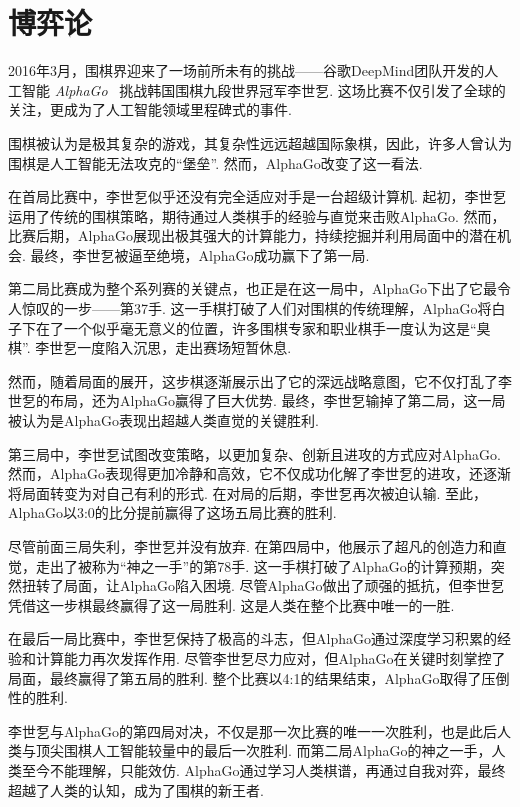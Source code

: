 \chapter{博弈论}\label{chap:game}

2016年3月，围棋界迎来了一场前所未有的挑战——谷歌DeepMind团队开发的人工智能 \textit{AlphaGo}~\cite{silverMasteringGameGo2016} 挑战韩国围棋九段世界冠军李世乭. 这场比赛不仅引发了全球的关注，更成为了人工智能领域里程碑式的事件. 

围棋被认为是极其复杂的游戏，其复杂性远远超越国际象棋，因此，许多人曾认为围棋是人工智能无法攻克的“堡垒”. 然而，AlphaGo改变了这一看法. 

在首局比赛中，李世乭似乎还没有完全适应对手是一台超级计算机. 起初，李世乭运用了传统的围棋策略，期待通过人类棋手的经验与直觉来击败AlphaGo. 然而，比赛后期，AlphaGo展现出极其强大的计算能力，持续挖掘并利用局面中的潜在机会. 最终，李世乭被逼至绝境，AlphaGo成功赢下了第一局. 

第二局比赛成为整个系列赛的关键点，也正是在这一局中，AlphaGo下出了它最令人惊叹的一步——第37手. 这一手棋打破了人们对围棋的传统理解，AlphaGo将白子下在了一个似乎毫无意义的位置，许多围棋专家和职业棋手一度认为这是“臭棋”. 李世乭一度陷入沉思，走出赛场短暂休息. 

然而，随着局面的展开，这步棋逐渐展示出了它的深远战略意图，它不仅打乱了李世乭的布局，还为AlphaGo赢得了巨大优势. 最终，李世乭输掉了第二局，这一局被认为是AlphaGo表现出超越人类直觉的关键胜利. 

第三局中，李世乭试图改变策略，以更加复杂、创新且进攻的方式应对AlphaGo. 然而，AlphaGo表现得更加冷静和高效，它不仅成功化解了李世乭的进攻，还逐渐将局面转变为对自己有利的形式. 在对局的后期，李世乭再次被迫认输. 至此，AlphaGo以3:0的比分提前赢得了这场五局比赛的胜利. 

尽管前面三局失利，李世乭并没有放弃. 在第四局中，他展示了超凡的创造力和直觉，走出了被称为“神之一手”的第78手. 这一手棋打破了AlphaGo的计算预期，突然扭转了局面，让AlphaGo陷入困境. 尽管AlphaGo做出了顽强的抵抗，但李世乭凭借这一步棋最终赢得了这一局胜利. 这是人类在整个比赛中唯一的一胜. 

在最后一局比赛中，李世乭保持了极高的斗志，但AlphaGo通过深度学习积累的经验和计算能力再次发挥作用. 尽管李世乭尽力应对，但AlphaGo在关键时刻掌控了局面，最终赢得了第五局的胜利. 整个比赛以4:1的结果结束，AlphaGo取得了压倒性的胜利. 

李世乭与AlphaGo的第四局对决，不仅是那一次比赛的唯一一次胜利，也是此后人类与顶尖围棋人工智能较量中的最后一次胜利. 而第二局AlphaGo的神之一手，人类至今不能理解，只能效仿. AlphaGo通过学习人类棋谱，再通过自我对弈，最终超越了人类的认知，成为了围棋的新王者. 

